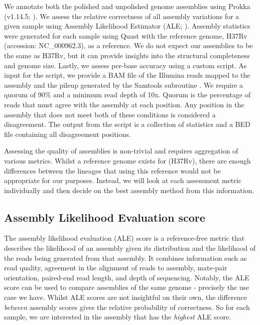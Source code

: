 We annotate both the polished and unpolished genome assemblies using Prokka (v1.14.5; \cite{seeman2014}). We assess the relative correctness of all assembly variations for a given sample using Assembly Likelihood Estimator (ALE; \cite{clark2013}). Assembly statistics were generated for each sample using Quast \cite{quast2013} with the \mtb{} reference genome, H37Rv (accession: NC\_000962.3), as a reference. We do not expect our assemblies to be the same as H37Rv, but it can provide insights into the structural completeness and genome size. Lastly, we assess per-base accuracy using a custom script. As input for the script, we provide a BAM file of the Illumina reads mapped to the assembly and the pileup generated by the Samtools subroutine  \cite{samtools2009}. We require a quorum of 90\% and a minimum read depth of 10x. Quorum is the percentage of reads that must agree with the assembly at each position. Any position in the assembly that does not meet both of these conditions is considered a disagreement. The output from the script is a collection of statistics and a BED file containing all disagreement positions.

Assessing the quality of \denovo{} assemblies is non-trivial and requires aggregation of various metrics. Whilst a reference genome exists for \mtb{} (H37Rv), there are enough differences between the \mtb{} lineages that using this reference would not be appropriate for our purposes. Instead, we will look at each assessment metric individually and then decide on the best assembly method from this information.

\subsection{Assembly Likelihood Evaluation score}

The assembly likelihood evaluation (ALE) score is a reference-free metric that describes the likelihood of an assembly given its \kmer{} distribution and the likelihood of the reads being generated from that assembly. It combines information such as read quality, agreement in the alignment of reads to assembly, mate-pair orientation, paired-end read length, and depth of sequencing. Notably, the ALE score can be used to compare assemblies of the same genome - precisely the use case we have. Whilst ALE scores are not insightful on their own, the difference \textit{between} assembly scores gives the relative probability of correctness. So for each sample, we are interested in the assembly that has the \textit{highest} ALE score.  

